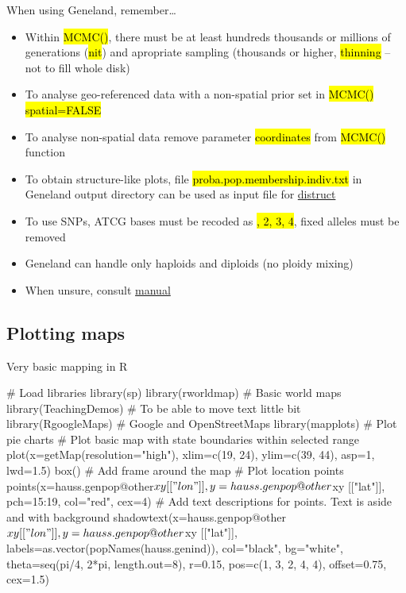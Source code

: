 \documentclass[compress, ucs, xelatex, 11pt, xcolor=svgnames,
  hyperref={
    bookmarks=true,
    unicode=true,
    colorlinks=true,
    pdftitle={Molecular data in R},
    plainpages=false,
    pdfauthor={Vojtech Zeisek},
    pdfsubject={Course about phylogeny and evolution in R},
    pdfcreator={XeLaTeX},
    pdfkeywords={R, evolution, phylogeny, molecular data},
    linkcolor=Tomato,
    anchorcolor=SaddleBrown,
    citecolor=Goldenrod,
    filecolor=DarkMagenta,
    menucolor=Sienna,
    urlcolor=DarkTurquoise,
    pdftex},
  url={hyphens, lowtilde} %
  ]{beamer}
\renewcommand{\texttt}[1]{\hl{\ttfamily #1}}
\begin{document}
\begin{frame}{When using Geneland, remember\ldots}
  \begin{itemize}
    \item Within \texttt{MCMC()}, there must be at least hundreds thousands or millions of generations (\texttt{nit}) and apropriate sampling (thousands or higher, \texttt{thinning} -- not to fill whole disk)
    \item To analyse geo-referenced data with a non-spatial prior set in \texttt{MCMC()} \texttt{spatial=FALSE}
    \item To analyse non-spatial data remove parameter \texttt{coordinates} from \texttt{MCMC()} function
    \item To obtain structure-like plots, file \texttt{proba.pop.membership.indiv.txt} in Geneland output directory can be used as input file for \href{https://web.stanford.edu/group/rosenberglab/distruct.html}{distruct}
    \item To use SNPs, ATCG bases must be recoded as \texttt{1, 2, 3, 4}, fixed alleles must be removed
    \item Geneland can handle only haploids and diploids (no ploidy mixing)
    \item When unsure, consult \href{https://www2.imm.dtu.dk/~gigu/Geneland/Geneland-Doc.pdf}{manual}
  \end{itemize}
\end{frame}

\subsection{Plotting maps}

\begin{frame}[fragile]{Very basic mapping in R}
  \begin{spluscode}
    # Load libraries
    library(sp)
    library(rworldmap) # Basic world maps
    library(TeachingDemos) # To be able to move text little bit
    library(RgoogleMaps) # Google and OpenStreetMaps
    library(mapplots) # Plot pie charts
    # Plot basic map with state boundaries within selected range
    plot(x=getMap(resolution="high"), xlim=c(19, 24), ylim=c(39, 44),
      asp=1, lwd=1.5)
    box() # Add frame around the map
    # Plot location points
    points(x=hauss.genpop@other$xy[["lon"]], y=hauss.genpop@other$xy
      [["lat"]], pch=15:19, col="red", cex=4)
    # Add text descriptions for points. Text is aside and with background
    shadowtext(x=hauss.genpop@other$xy[["lon"]], y=hauss.genpop@other$xy
      [["lat"]], labels=as.vector(popNames(hauss.genind)), col="black",
      bg="white", theta=seq(pi/4, 2*pi, length.out=8), r=0.15,
      pos=c(1, 3, 2, 4, 4), offset=0.75, cex=1.5)
  \end{spluscode}
\end{frame}
\end{document}

